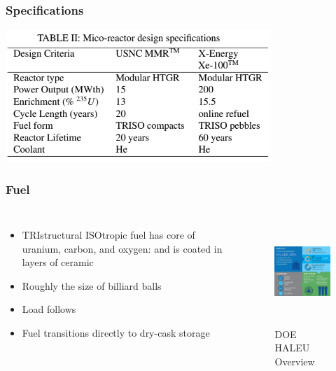 \begin{frame}[fragile]
        \frametitle{Specifications}
        \begin{center}
              \includegraphics[height=5cm]{./images/specifications.png}
      \end{center}
\end{frame}

\begin{frame}
  \frametitle{Fuel}
        \begin{columns}
                \column[t]{5cm}
                \begin{itemize}
                        \item TRIstructural ISOtropic fuel has core of uranium, carbon, and oxygen: and is coated in layers of ceramic
                        \item Roughly the size of billiard balls
                        \item Load follows
                        \item Fuel transitions directly to dry-cask storage
                \end{itemize}

                \column[t]{5cm}
        \begin{figure}[htbp!]
        \begin{center}
      \includegraphics[height=4cm]{./images/HALEU_overview.jpg}
    \end{center}
          \caption{DOE HALEU Overview \cite{haleu_doe_overview}}
    \label{fig:doe_haleu_overview}
  \end{figure}
        \end{columns}
\end{frame}

